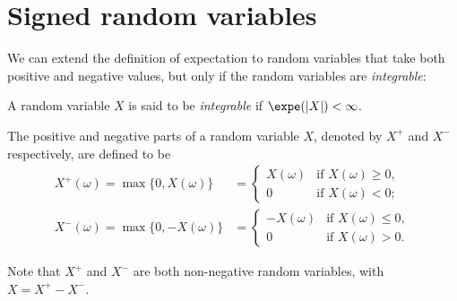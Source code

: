%
%
%
%


\newpage
\section{Signed random variables}\label{sec:expe_signed}

We can extend the definition of expectation to random variables that take both positive and negative values, but only if the random variables are \emph{integrable}:

\begin{definition}
A random variable $X$ is said to be \emph{integrable} if $\expe(|X|) < \infty$.
\end{definition}

\begin{definition}
The positive and negative parts of a random variable $X$, denoted by $X^{+}$ and $X^{-}$ respectively, are defined to be
\begin{align*}
X^{+}(\omega) = \max\{0,X(\omega)\}	
	& = \begin{cases} 
			X(\omega)	& \text{if } X(\omega)\geq 0, \\
	   		0 		 	& \text{if } X(\omega) < 0;
	\end{cases} \\
X^{-}(\omega) = \max\{0,-X(\omega)\} 
	& = \begin{cases} 
			-X(\omega)	& \text{if } X(\omega)\leq 0, \\
			0 		 	& \text{if } X(\omega) > 0.
		\end{cases}
\end{align*}
\end{definition}
Note that $X^{+}$ and $X^{-}$ are both non-negative random variables, with $X = X^{+} - X^{-}$.

